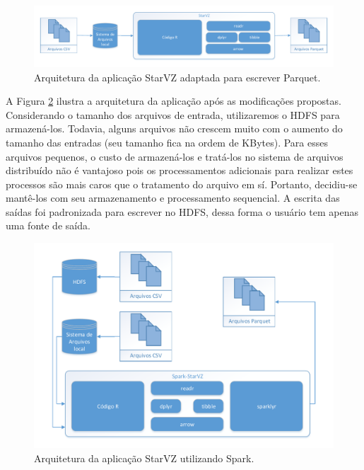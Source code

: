 \begin{figure}[ht]
 \centerline{\includegraphics[width=1\textwidth]{./img/starvz-arch-arrow.pdf}}
 \caption{Arquitetura da aplicação StarVZ adaptada para escrever Parquet.}
 \label{fig:starvz-app-arrow}
\end{figure}

A Figura \ref{fig:starvz-app-spark} ilustra a arquitetura da aplicação após as 
modificações propostas. Considerando o tamanho dos arquivos de entrada, 
utilizaremos o HDFS para armazená-los. Todavia, alguns arquivos não crescem 
muito com o aumento do tamanho das entradas (seu tamanho fica na ordem de 
KBytes). Para esses arquivos pequenos, o custo de armazená-los e tratá-los no 
sistema de arquivos distribuído não é vantajoso pois os processamentos 
adicionais para realizar estes processos são mais caros que o tratamento do 
arquivo em sí. Portanto, decidiu-se mantê-los com seu armazenamento e 
processamento sequencial. A escrita das saídas foi padronizada para escrever no 
HDFS, dessa forma o usuário tem apenas uma fonte de saída.

\begin{figure}[ht]
 \centerline{\includegraphics[width=1\textwidth]{./img/starvz-arch-spark.pdf}}
 \caption{Arquitetura da aplicação StarVZ utilizando Spark.}
 \label{fig:starvz-app-spark}
\end{figure}


